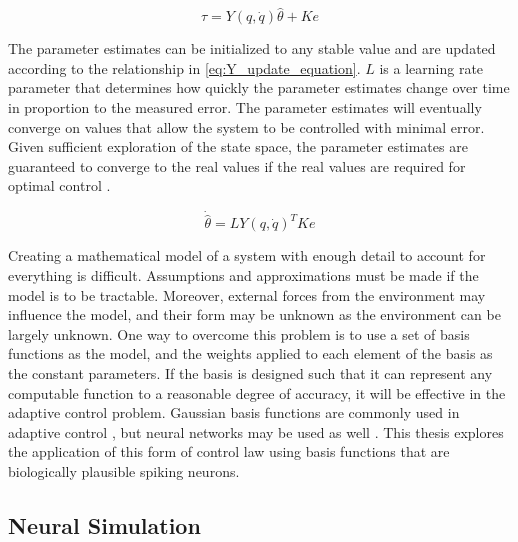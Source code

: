 \documentclass[letterpaper, 10 pt, conference]{ieeeconf}  %
\begin{document}
\begin{equation} \label{eq:Y_and_control_law}
\tau = Y(q,\dot{q})\hat{\theta} + Ke
\end{equation}

The parameter estimates can be initialized to any stable value and are updated according to the relationship in \eqref{eq:Y_update_equation}.
$L$ is a learning rate parameter that determines how quickly the parameter estimates change over time in proportion to the measured error.
The parameter estimates will eventually converge on values that allow the system to be controlled with minimal error.
Given sufficient exploration of the state space, the parameter estimates are guaranteed to converge to the real values if the real values are required for optimal control \cite{slotine1987adaptive}.

\begin{equation} \label{eq:Y_update_equation}
\dot{\hat{\theta}} = LY(q,\dot{q})^{T}Ke
\end{equation}


Creating a mathematical model of a system with enough detail to account for everything is difficult. 
Assumptions and approximations must be made if the model is to be tractable. 
Moreover, external forces from the environment may influence the model, and their form may be unknown as the environment can be largely unknown. 
One way to overcome this problem is to use a set of basis functions as the model, and the weights applied to each element of the basis as the constant parameters. 
If the basis is designed such that it can represent any computable function to a reasonable degree of accuracy, it will be effective in the adaptive control problem. 
Gaussian basis functions are commonly used in adaptive control \cite{sanner1992gaussian}, but neural networks may be used as well \cite{barto1983neuronlike}.
This thesis explores the application of this form of control law using basis functions that are biologically plausible spiking neurons.

\subsection{Neural Simulation}
\end{document}
